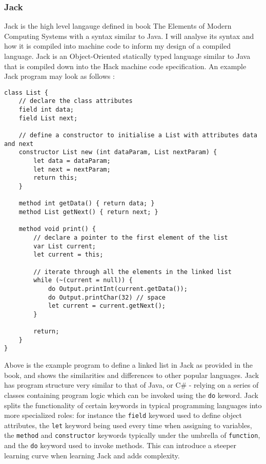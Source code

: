 \subsubsection{Jack}
Jack is the high level langauge defined in book The Elements of Modern Computing Systems \textcite{EOCS} with a syntax similar to Java. I will analyse its syntax and how it is compiled into machine code to inform my design of a compiled language. Jack is an Object-Oriented statically typed language similar to Java that is compiled down into the Hack machine code specification. An example Jack program may look as follows \textcite{EOCS}:
\begin{lstlisting}
class List {
    // declare the class attributes
    field int data;
    field List next;

    // define a constructor to initialise a List with attributes data and next
    constructor List new (int dataParam, List nextParam) {
        let data = dataParam;
        let next = nextParam;
        return this;
    }

    method int getData() { return data; }
    method List getNext() { return next; }

    method void print() {
        // declare a pointer to the first element of the list
        var List current;
        let current = this;

        // iterate through all the elements in the linked list
        while (~(current = null)) {
            do Output.printInt(current.getData());
            do Output.printChar(32) // space
            let current = current.getNext();
        }

        return;
    }
}
\end{lstlisting}


Above is the example program to define a linked list in Jack as provided in the book, and shows the similarities and differences to other popular languages. Jack has program structure very similar to that of Java, or C\# - relying on a series of classes containing program logic which can be invoked using the \texttt{do} keword. Jack splits the functionality of certain keywords in typical programming languages into more specialized roles: for instance the \texttt{field} keyword used to define object attributes, the \texttt{let} keyword being used every time when assigning to variables, the \texttt{method} and \texttt{constructor} keywords typically under the umbrella of \texttt{function}, and the \texttt{do} keyword used to invoke methods. This can introduce a steeper learning curve when learning Jack and adds complexity.

